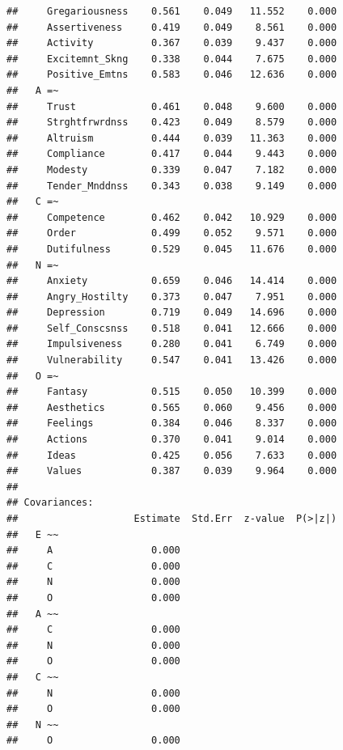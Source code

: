 \documentclass{article}\usepackage[]{graphicx}\usepackage[]{color}
\makeatletter
\newenvironment{kframe}{%
 \def\at@end@of@kframe{}%
 \ifinner\ifhmode%
  \def\at@end@of@kframe{\end{minipage}}%
  \begin{minipage}{\columnwidth}%
 \fi\fi%
 \def\FrameCommand##1{\hskip\@totalleftmargin \hskip-\fboxsep
 \colorbox{shadecolor}{##1}\hskip-\fboxsep
     \hskip-\linewidth \hskip-\@totalleftmargin \hskip\columnwidth}%
 \MakeFramed {\advance\hsize-\width
   \@totalleftmargin\z@ \linewidth\hsize
   \@setminipage}}%
 {\par\unskip\endMakeFramed%
 \at@end@of@kframe}
\newenvironment{knitrout}{}{} %
\makeatother
\begin{document}
\begin{knitrout}
\begin{kframe}
\begin{verbatim}
##     Gregariousness    0.561    0.049   11.552    0.000
##     Assertiveness     0.419    0.049    8.561    0.000
##     Activity          0.367    0.039    9.437    0.000
##     Excitemnt_Skng    0.338    0.044    7.675    0.000
##     Positive_Emtns    0.583    0.046   12.636    0.000
##   A =~                                                
##     Trust             0.461    0.048    9.600    0.000
##     Strghtfrwrdnss    0.423    0.049    8.579    0.000
##     Altruism          0.444    0.039   11.363    0.000
##     Compliance        0.417    0.044    9.443    0.000
##     Modesty           0.339    0.047    7.182    0.000
##     Tender_Mnddnss    0.343    0.038    9.149    0.000
##   C =~                                                
##     Competence        0.462    0.042   10.929    0.000
##     Order             0.499    0.052    9.571    0.000
##     Dutifulness       0.529    0.045   11.676    0.000
##   N =~                                                
##     Anxiety           0.659    0.046   14.414    0.000
##     Angry_Hostilty    0.373    0.047    7.951    0.000
##     Depression        0.719    0.049   14.696    0.000
##     Self_Conscsnss    0.518    0.041   12.666    0.000
##     Impulsiveness     0.280    0.041    6.749    0.000
##     Vulnerability     0.547    0.041   13.426    0.000
##   O =~                                                
##     Fantasy           0.515    0.050   10.399    0.000
##     Aesthetics        0.565    0.060    9.456    0.000
##     Feelings          0.384    0.046    8.337    0.000
##     Actions           0.370    0.041    9.014    0.000
##     Ideas             0.425    0.056    7.633    0.000
##     Values            0.387    0.039    9.964    0.000
## 
## Covariances:
##                    Estimate  Std.Err  z-value  P(>|z|)
##   E ~~                                                
##     A                 0.000                           
##     C                 0.000                           
##     N                 0.000                           
##     O                 0.000                           
##   A ~~                                                
##     C                 0.000                           
##     N                 0.000                           
##     O                 0.000                           
##   C ~~                                                
##     N                 0.000                           
##     O                 0.000                           
##   N ~~                                                
##     O                 0.000                           

\end{verbatim}
\end{kframe}
\end{knitrout}
\end{document}
